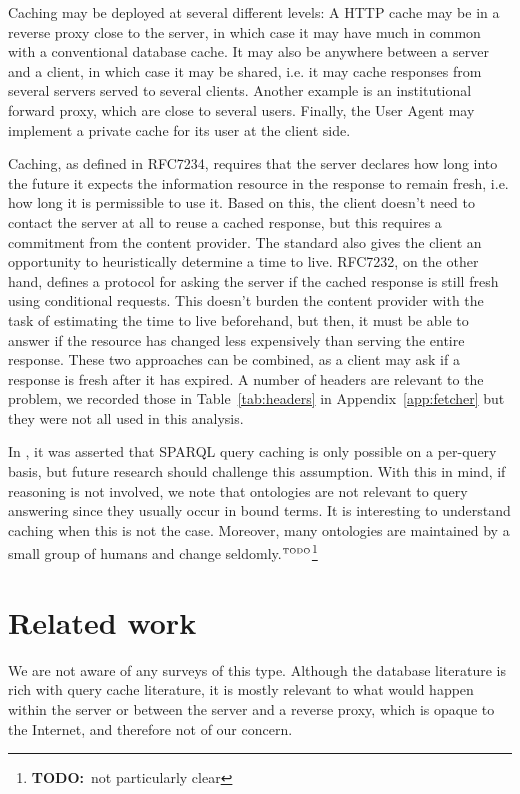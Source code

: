 \documentclass{llncs}
\newcommand{\todo}[1]{\ensuremath{^{\textrm{\tiny{TODO}\normalsize}}}\footnote{\textbf{TODO:}~#1}}
\begin{document}
Caching may be deployed at several different levels: A HTTP cache may
be in a reverse proxy close to the server, in which case it may have
much in common with a conventional database cache. It may also be
anywhere between a server and a client, in which case it may be
shared, i.e. it may cache responses from several servers served to
several clients. Another example is an institutional forward proxy,
which are close to several users. Finally, the User Agent may
implement a private cache for its user at the client side.

Caching, as defined in RFC7234, requires that the server declares how
long into the future it expects the information resource in the
response to remain fresh, i.e. how long it is permissible to use
it. Based on this, the client doesn't need to contact the server at
all to reuse a cached response, but this requires a commitment from
the content provider. The standard also gives the client an
opportunity to heuristically determine a time to live. RFC7232, on the
other hand, defines a protocol for asking the server if the cached
response is still fresh using conditional requests. This doesn't
burden the content provider with the task of estimating the time to
live beforehand, but then, it must be able to answer if the resource
has changed less expensively than serving the entire response. These
two approaches can be combined, as a client may ask if a response is
fresh after it has expired. A number of headers are relevant to the
problem, we recorded those in Table~\ref{tab:headers} in
Appendix~\ref{app:fetcher} but they were not all used in this analysis. 

In \cite{ldf1}, it was asserted that SPARQL query caching is only
possible on a per-query basis, but future research should challenge
this assumption. With this in mind, if reasoning is not involved, we
note that ontologies are not relevant to query answering since they
usually occur in bound terms. It is interesting to understand caching
when this is not the case. Moreover, many ontologies are maintained by
a small group of humans and change seldomly.\todo{not particularly clear}

\section{Related work}

We are not aware of any surveys of this type. Although the database
literature is rich with query cache literature, it is mostly relevant
to what would happen within the server or between the server and a
reverse proxy, which is opaque to the Internet, and therefore not of
our concern.
\end{document}
